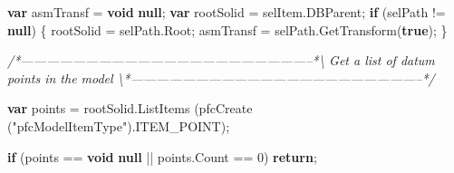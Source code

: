 \documentclass[]{article}
\newenvironment{Shaded}{}{}
\newcommand{\KeywordTok}[1]{\textcolor[rgb]{0.00,0.44,0.13}{\textbf{{#1}}}}
\newcommand{\DecValTok}[1]{\textcolor[rgb]{0.25,0.63,0.44}{{#1}}}
\newcommand{\StringTok}[1]{\textcolor[rgb]{0.25,0.44,0.63}{{#1}}}
\newcommand{\CommentTok}[1]{\textcolor[rgb]{0.38,0.63,0.69}{\textit{{#1}}}}
\newcommand{\OtherTok}[1]{\textcolor[rgb]{0.00,0.44,0.13}{{#1}}}
\newcommand{\FunctionTok}[1]{\textcolor[rgb]{0.02,0.16,0.49}{{#1}}}
\newcommand{\NormalTok}[1]{{#1}}
\begin{document}
\begin{Shaded}
\begin{Highlighting}[]
  \KeywordTok{var} \NormalTok{asmTransf = }\KeywordTok{void} \KeywordTok{null}\NormalTok{;}
  \KeywordTok{var} \NormalTok{rootSolid = }\OtherTok{selItem}\NormalTok{.}\FunctionTok{DBParent}\NormalTok{;}
  \KeywordTok{if} \NormalTok{(selPath != }\KeywordTok{null}\NormalTok{)}
    \NormalTok{\{}
      \NormalTok{rootSolid = }\OtherTok{selPath}\NormalTok{.}\FunctionTok{Root}\NormalTok{;}
      \NormalTok{asmTransf = }\OtherTok{selPath}\NormalTok{.}\FunctionTok{GetTransform}\NormalTok{(}\KeywordTok{true}\NormalTok{);   }
    \NormalTok{\}}
  
\CommentTok{/*--------------------------------------------------------------------*\textbackslash{} }
\CommentTok{  Get a list of datum points in the model}
\CommentTok{\textbackslash{}*--------------------------------------------------------------------*/}
  
  \KeywordTok{var} \NormalTok{points = }
    \OtherTok{rootSolid}\NormalTok{.}\FunctionTok{ListItems} \NormalTok{(}\FunctionTok{pfcCreate} \NormalTok{(}\StringTok{"pfcModelItemType"}\NormalTok{).}\FunctionTok{ITEM_POINT}\NormalTok{);}
  
  \KeywordTok{if} \NormalTok{(points == }\KeywordTok{void} \KeywordTok{null} \NormalTok{|| }\OtherTok{points}\NormalTok{.}\FunctionTok{Count} \NormalTok{== }\DecValTok{0}\NormalTok{)}
    \KeywordTok{return}\NormalTok{;}
  

\end{Highlighting}
\end{Shaded}
\end{document}
